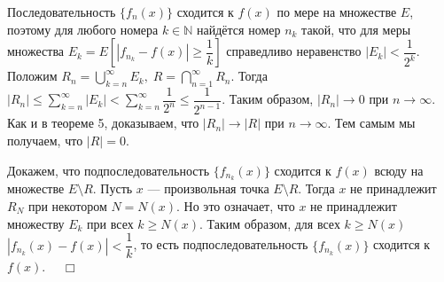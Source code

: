 \documentclass[12pt,a4paper, titlepage]{article}
\begin{document}
Последовательность $\lbrace f_n(x) \rbrace$ сходится к $f(x)$ по мере на множестве $E$, поэтому для любого номера $k \in \mathbb{N}$ найдётся номер $n_k$ такой, что для меры множества $E_k = E[|f_{n_k} - f(x)| \geqslant \dfrac 1 k]$ справедливо неравенство $|E_k| < \dfrac 1 {2^k}$. Положим $R_n = \bigcup\limits_{k=n}^\infty E_k, \; R = \bigcap\limits_{n=1}^\infty R_n$. Тогда $|R_n| \leqslant \sum\limits_{k=n}^\infty |E_k| < \sum\limits_{k=n}^\infty \dfrac{1}{2^{n}} \leqslant \dfrac{1}{2^{n-1}}$. Таким образом, $|R_n| \to 0$ при $n \to \infty$. Как и в теореме 5, доказываем, что $|R_n| \to |R|$ при $n \to \infty$. Тем самым мы получаем, что $|R| = 0$.

Докажем, что подпоследовательность $\lbrace f_{n_k}(x) \rbrace$ сходится к $f(x)$ всюду на множестве $E \setminus R$. Пусть $x$ --- произвольная точка $E \setminus R$. Тогда $x$ не принадлежит $R_N$ при некотором $N = N(x)$. Но это означает, что $x$ не принадлежит множеству $E_k$ при всех $k \geqslant N(x)$. Таким образом, для всех $k \geqslant N(x)$ $|f_{n_k}(x) - f(x)| < \dfrac 1 k$, то есть подпоследовательность $\lbrace f_{n_k}(x) \rbrace$ сходится к $f(x)$. $\quad \Box$\\
\end{document}
